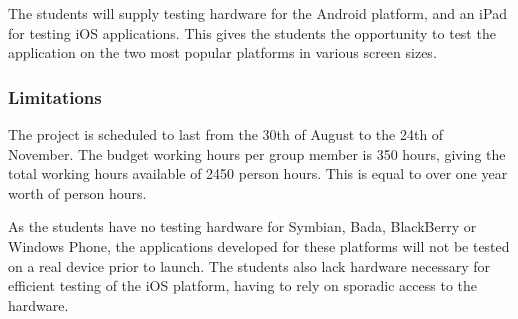 The students will supply testing hardware for the Android platform, and an iPad
for testing iOS applications. This gives the students the opportunity to test
the application on the two most popular platforms in various screen sizes.

\subsubsection{Limitations}
The project is scheduled to last from the 30th of August to the 24th of
November. The budget working hours per group member is 350 hours, giving the
total working hours available of 2450 person hours. This is equal to over one
year worth of person hours. 

As the students have no testing hardware for Symbian, Bada, BlackBerry or
Windows Phone, the applications developed for these platforms will not be
tested on a real device prior to launch. The students also lack hardware
necessary for efficient testing of the iOS platform, having to rely on sporadic
access to the hardware.
